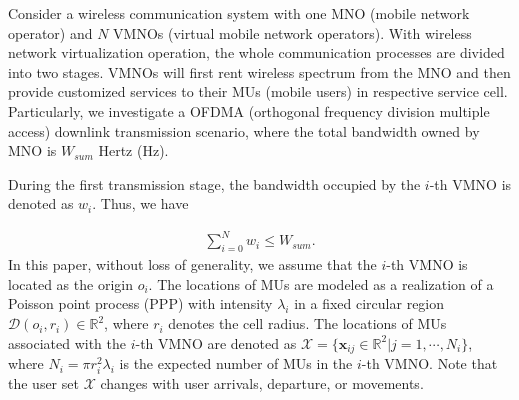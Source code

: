 \documentclass[journal]{IEEEtran}
\begin{document}
Consider a wireless communication system with one MNO (mobile network operator) and $N$ VMNOs (virtual mobile network operators). With wireless network virtualization operation, the whole communication processes are divided into two stages. VMNOs will first rent wireless spectrum from the MNO and then provide customized services to their MUs (mobile users) in respective service cell. Particularly, we investigate a OFDMA (orthogonal frequency division multiple access) downlink transmission scenario, where the total bandwidth owned by MNO is $W_{sum}$ Hertz (Hz). 

During the first transmission stage, the bandwidth occupied by the $i$-th VMNO is denoted as $w_i$. Thus, we have

\begin{align}
\sum_{i = 0}^{N} w_i \leq W_{sum}.
\end{align}
In this paper, without loss of generality, we assume that the $i$-th VMNO is located as the origin $o_i$. The locations of MUs are modeled as a realization of a Poisson point process (PPP) with intensity $\lambda_i$ in a fixed circular region $\mathcal{D}(o_i, r_i) \in \mathbb{R}^2$, where $r_i$ denotes the cell radius. The locations of MUs associated with the $i$-th VMNO are denoted as $\mathcal{X} = \{\mathbf{x}_{ij} \in \mathbb{R}^2 | j = 1, \cdots, N_i\}$, where $N_i = \pi r_i^2 \lambda_i$ is the expected number of MUs in the $i$-th VMNO. Note that the user set $\mathcal{X}$ changes with user arrivals, departure, or movements.
\end{document}
